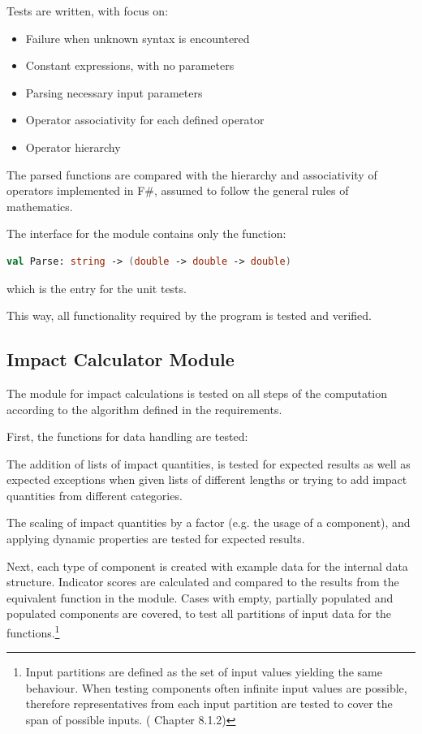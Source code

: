 Tests are written, with focus on:
\begin{itemize}
    \item Failure when unknown syntax is encountered
    \item Constant expressions, with no parameters
    \item Parsing necessary input parameters
    \item Operator associativity for each defined operator
    \item Operator hierarchy
\end{itemize}

The parsed functions are compared with the hierarchy and associativity of operators implemented in F\#, assumed to follow the general rules of mathematics.

The interface for the module contains only the function:

\begin{lstlisting}[language=FSharp]
val Parse: string -> (double -> double -> double)
\end{lstlisting}

which is the entry for the unit tests.

This way, all functionality required by the program is tested and verified.

\subsection{Impact Calculator Module} \label{ssec:Testing-ImpactCalculatorModule}
The module for impact calculations is tested on all steps of the computation according to the algorithm defined in the requirements. 

First, the functions for data handling are tested:

The addition of lists of impact quantities, is tested for expected results as well as expected exceptions when given lists of different lengths or trying to add impact quantities from different categories. 

The scaling of impact quantities by a factor (e.g. the usage of a component), and applying dynamic properties are tested for expected results. 

Next, each type of component is created with example data for the internal data structure. Indicator scores are calculated and compared to the results from the equivalent function in the module. Cases with empty, partially populated and populated components are covered, to test all partitions of input data for the functions.\footnote{Input partitions are defined as the set of input values yielding the same behaviour. When testing components often infinite input values are possible, therefore representatives from each input partition are tested to cover the span of possible inputs. (\cite{SoftwareEngineering} Chapter 8.1.2)}

